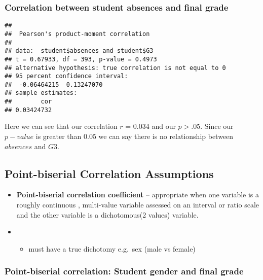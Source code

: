 \documentclass[
]{book}
\newenvironment{Shaded}{\begin{snugshade}}{\end{snugshade}}
\newcommand{\FunctionTok}[1]{\textcolor[rgb]{0.13,0.29,0.53}{\textbf{#1}}}
\newcommand{\NormalTok}[1]{#1}
\newcommand{\SpecialCharTok}[1]{\textcolor[rgb]{0.81,0.36,0.00}{\textbf{#1}}}
\providecommand{\tightlist}{%
  \setlength{\itemsep}{0pt}\setlength{\parskip}{0pt}}
\theoremstyle{definition}
\theoremstyle{definition}
\theoremstyle{definition}
\theoremstyle{definition}
\theoremstyle{remark}
\begin{document}
\hypertarget{correlation-between-student-absences-and-final-grade}{%
\subsubsection{Correlation between student absences and final grade}\label{correlation-between-student-absences-and-final-grade}}

\begin{Shaded}
\end{Shaded}

\begin{verbatim}
## 
##  Pearson's product-moment correlation
## 
## data:  student$absences and student$G3
## t = 0.67933, df = 393, p-value = 0.4973
## alternative hypothesis: true correlation is not equal to 0
## 95 percent confidence interval:
##  -0.06464215  0.13247070
## sample estimates:
##        cor 
## 0.03424732
\end{verbatim}

Here we can see that our correlation \(r\) = 0.034 and our \(p>.05\). Since our \(p-value\) is greater than \(0.05\) we can say there is no relationship between \(absences\) and \(G3\).

\hypertarget{point-biserial-correlation-assumptions}{%
\subsection{Point-biserial Correlation Assumptions}\label{point-biserial-correlation-assumptions}}

\begin{itemize}
\item
  \textbf{Point-biserial correlation coefficient} -- appropriate when one variable is a roughly continuous , multi-value variable assessed on an interval or ratio scale and the other variable is a dichotomous(2 values) variable.
\item
  \begin{itemize}
  \tightlist
  \item
    must have a true dichotomy e.g.~sex (male vs female)
  \end{itemize}
\end{itemize}

\hypertarget{point-biserial-correlation-student-gender-and-final-grade}{%
\subsubsection{Point-biserial correlation: Student gender and final grade}\label{point-biserial-correlation-student-gender-and-final-grade}}
\end{document}
